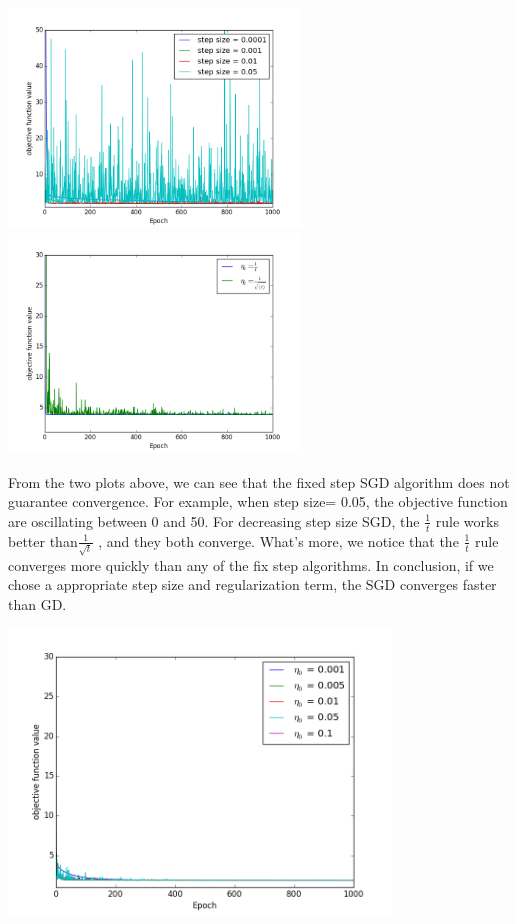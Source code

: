\documentclass{article}
\newenvironment{sub}[2][$-$]{\begin{trivlist}
		\item[\hskip \labelsep {\bfseries #1}\hskip \labelsep {\bfseries #2.}]}  {\end{trivlist}}
\begin{document}
\begin{center}
\includegraphics[height = 2.3in]{2_6_3_1.png}
\includegraphics[height = 2.3in]{2_6_3_2.png}
\end{center}

From the two plots above, we can see that the fixed step SGD algorithm does not guarantee convergence. For example, when step size= 0.05, the objective function are oscillating between 0 and 50. For decreasing step size SGD, the $\frac{1}{t}$ rule works better than$\frac{1}{\sqrt{t}}$ , and they both converge. What's more, we notice that the $\frac{1}{t}$ rule converges more quickly than any of the fix step algorithms. In conclusion, if we chose a appropriate step size and regularization term, the SGD converges faster than GD.

\begin{sub}{2.6.4}
	\end{sub}

\begin{center}
	\includegraphics[height = 3in ]{2_6_4.png}
\end{center}
\end{document}
